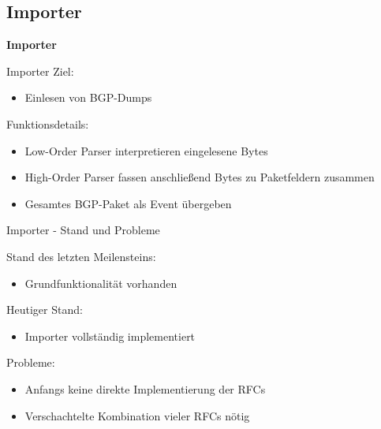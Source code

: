 \documentclass[9pt]{beamer}
\begin{document}
\subsection{Importer}

\begin{frame}{}
	\begin{center}
		\LARGE \textbf{Importer}
	\end{center}
\end{frame}

\begin{frame}{Importer}{}
   Ziel:
   	\begin{itemize}
   	\item Einlesen von BGP-Dumps
   	\end{itemize}
   	\vspace{0,3cm}
   Funktionsdetails:
	\begin{itemize}
		\item Low-Order Parser interpretieren eingelesene Bytes
		\item High-Order Parser fassen anschließend Bytes zu Paketfeldern zusammen
		\item Gesamtes BGP-Paket als Event übergeben
	\end{itemize}
\end{frame}

\begin{frame}{Importer - Stand und Probleme}{}

	Stand des letzten Meilensteins:
	\begin{itemize}
		\item Grundfunktionalität vorhanden
	\end{itemize}
	\vspace{0,3cm}
	Heutiger Stand:
	\begin{itemize}
		\item Importer vollständig implementiert
	\end{itemize}
	\vspace{0,3cm}
	Probleme:
	\begin{itemize}
		\item Anfangs keine direkte Implementierung der RFCs
		\item Verschachtelte Kombination vieler RFCs nötig
	\end{itemize}
\end{frame}
\end{document}

